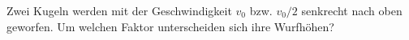 Zwei Kugeln werden mit der Geschwindigkeit $v_0$ bzw. $v_0/2$ senkrecht nach oben geworfen. Um welchen Faktor unterscheiden sich ihre Wurfhöhen?
